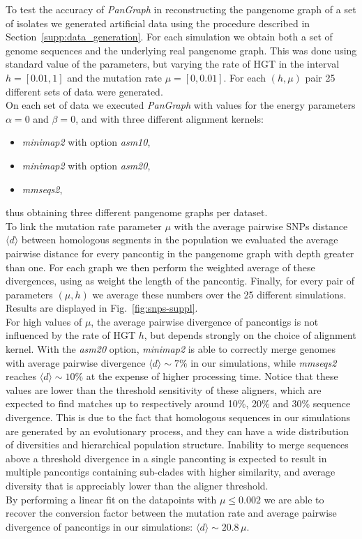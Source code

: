 \documentclass[aps,rmp,reprint,superscriptaddress,notitlepage,10pt,onecolumn]{revtex4-1}
\newcommand{\avg}[1]{\langle #1 \rangle}
\begin{document}
To test the accuracy of \textit{PanGraph} in reconstructing the pangenome graph of a set of isolates we generated artificial data using the procedure described in Section~\ref{supp:data_generation}. For each simulation we obtain both a set of genome sequences and the underlying real pangenome graph. This was done using standard value of the parameters, but varying the rate of HGT in the interval $h=[0.01,1]$ and the mutation rate $\mu=[0,0.01]$. For each $(h,\mu)$ pair 25 different sets of data were generated.\\
On each set of data we executed \textit{PanGraph} with values for the energy parameters $\alpha=0$ and $\beta=0$, and with three different alignment kernels: 
\begin{itemize}
    \itemsep0pt
    \item \textit{minimap2} with option \textit{asm10},
    \item \textit{minimap2} with option \textit{asm20},
    \item \textit{mmseqs2},
\end{itemize}
thus obtaining three different pangenome graphs per dataset.\\
To link the mutation rate parameter $\mu$ with the average pairwise SNPs distance $\avg{d}$ between homologous segments in the population we evaluated the average pairwise distance for every pancontig in the pangenome graph with depth greater than one. For each graph we then perform the weighted average of these divergences, using as weight the length of the pancontig. Finally, for every pair of parameters $(\mu,h)$ we average these numbers over the 25 different simulations. Results are displayed in Fig.~\ref{fig:snps-suppl}.\\
For high values of $\mu$, the average pairwise divergence of pancontigs is not influenced by the rate of HGT $h$, but depends strongly on the choice of alignment kernel. With the \textit{asm20} option, \textit{minimap2} is able to correctly merge genomes with average pairwise divergence $\avg{d} \sim 7\%$ in our simulations, while \textit{mmseqs2} reaches $\avg{d} \sim 10\%$ at the expense of higher processing time. Notice that these values are lower than the threshold sensitivity of these aligners, which are expected to find matches up to respectively around 10\%, 20\% and 30\% sequence divergence. This is due to the fact that homologous sequences in our simulations are generated by an evolutionary process, and they can have a wide distribution of diversities and hierarchical population structure. Inability to merge sequences above a threshold divergence in a single panconting is expected to result in multiple pancontigs containing sub-clades with higher similarity, and average diversity that is appreciably lower than the aligner threshold.\\
By performing a linear fit on the datapoints with $\mu \leq 0.002$ we are able to recover the conversion factor between the mutation rate and average pairwise divergence of pancontigs in our simulations: $\avg{d} \sim 20.8 \, \mu$.
\end{document}
